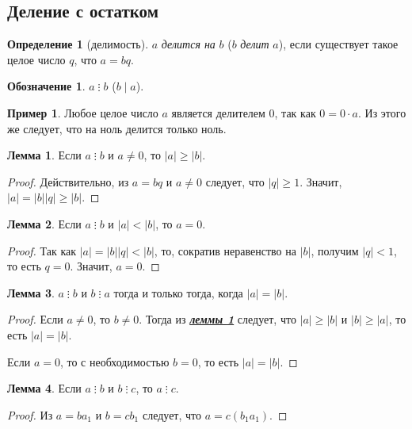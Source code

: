 \documentclass[14pt, a4paper]{extarticle}
\theoremstyle{definition}
\newtheorem*{definition}{Определение}
\newtheorem{lemma}{Лемма}
\newtheorem*{desig}{Обозначение}
\newtheorem{example}{Пример}
\newcommand{\divisible}{\mathop{\vdots}}
\begin{document}
\subsection{Деление с остатком}
\label{subsection:del}
	
	\begin{definition}[делимость]
		$a$ \emph{делится на} $b$ ($b$ \emph{делит} $a$), если существует такое целое число $q$, что $a=bq$.
	\end{definition}

	\begin{desig}
		$a\divisible b$ ($b\mid a$).
	\end{desig}
	
	\begin{example}
		Любое целое число $a$ является делителем $0$, так как \mbox{$0=0\cdot a$}. Из этого же следует, что на ноль делится только ноль.
	\end{example}

	\begin{lemma}
	\label{geq}
		Если $a\divisible b$ и $a\neq0$, то $|a|\geqslant|b|$.
	\end{lemma}
	\begin{proof}
		Действительно, из $a=bq$ и $a\neq0$ следует, что $|q|\geqslant1$. Значит, $|a|=|b||q|\geqslant|b|$.
	\end{proof}

	\begin{lemma}
	\label{leq}
		Если $a\divisible b$ и $|a|<|b|$, то $a=0$.
	\end{lemma}
	\begin{proof}
		Так как $|a|=|b||q|<|b|$, то, сократив неравенство на $|b|$, получим $|q|<1$, то есть $q=0$. Значит, $a=0$.
	\end{proof}

	\begin{lemma}
	\label{rav}
		$a\divisible b$ и $b\divisible a$ тогда и только тогда, когда $|a|=|b|$.
	\end{lemma}
	\begin{proof}
		Если $a\neq0$, то $b\neq0$. Тогда из \hyperref[geq]{\textbf{\textit{леммы \ref*{geq}}}} следует, что $|a|\geqslant|b|$ и $|b|\geqslant|a|$, то есть $|a|=|b|$.
		
		Если $a=0$, то с необходимостью $b=0$, то есть $|a|=|b|$.
	\end{proof}

	\begin{lemma}
	\label{tran}
		Если $a\divisible b$ и $b\divisible c$, то $a\divisible c$.
	\end{lemma}
	\begin{proof}
		Из $a=ba_1$ и $b=cb_1$ следует, что $a=c(b_1a_1)$.
	\end{proof}
\end{document}
